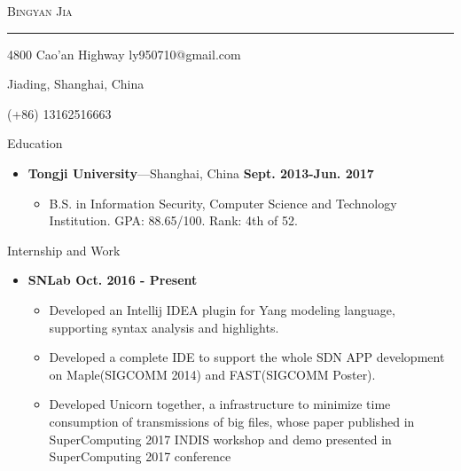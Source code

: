 \documentclass[10pt,oneside]{article}
\newcommand{\bigname}[1]{
	\begin{center}\fontfamily{phv}\selectfont\Huge\scshape#1\end{center}
}
\newenvironment{ressection}[1]{
	\vspace{4pt}
	{\fontfamily{phv}\selectfont\Large#1}
	\begin{itemize}
	\vspace{3pt}
}{
	\end{itemize}
}
\newcommand{\resitem}[1]{
	\vspace{-4pt}
	\item \begin{flushleft} #1 \end{flushleft}
}
\newcommand{\ressubitem}[1]{
	\vspace{-1pt}
	\item \begin{flushleft} #1 \end{flushleft}
}
\newcommand{\resbigitem}[3]{
	\vspace{-5pt}
	\item
	\textbf{#1}---#2 \
	\textit{#3}
}
\newenvironment{ressubsec}[3]{
	\resbigitem{#1}{#2}{#3}
	\vspace{-2pt}
	\begin{itemize}
}{
	\end{itemize}
}
\newenvironment{reslist}[1]{
	\resitem{\textbf{#1}}
	\vspace{-5pt}
	\begin{itemize}
}{
	\end{itemize}
}
\begin{document}
 \selectfont

\bigname{Bingyan Jia}

\vspace{-8pt} \rule{\textwidth}{1pt}

\vspace{-1pt} {4800 Cao'an Highway \hfill ly950710@gmail.com}

\vspace{-1pt} {Jiading, Shanghai, China}

\vspace{-1pt} {(+86) 13162516663}

\vspace{8 pt}

\newcommand{\textsharp}{$\sharp$}

\begin{ressection}{Education}
	\begin{ressubsec}{Tongji University}{Shanghai, China \hfill \textbf{Sept. 2013-Jun. 2017}}{}
		\ressubitem{B.S. in Information Security, Computer Science and Technology Institution. GPA: 88.65/100. Rank: 4th of 52. }
	\end{ressubsec}
\end{ressection}


\begin{ressection}{Internship and Work}
	\begin{reslist}{SNLab \hfill Oct. 2016 - Present}
		\ressubitem{Developed an Intellij IDEA plugin for Yang modeling language, supporting syntax analysis and highlights.}
        \ressubitem{Developed a complete IDE to support the whole SDN APP development on Maple(SIGCOMM 2014) and FAST(SIGCOMM Poster).}
		\ressubitem{Developed Unicorn together, a infrastructure to minimize time consumption of transmissions of big files, whose paper published in SuperComputing 2017 INDIS workshop and demo presented in SuperComputing 2017 conference}
	\end{reslist}
\end{ressection}
	
\end{document}

